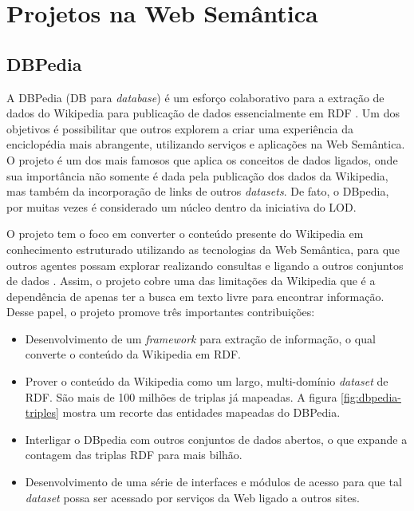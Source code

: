 \section{Projetos na Web Semântica}

\subsection{DBPedia}

A DBPedia (DB para \textit{database}) é um esforço colaborativo para a extração de dados do Wikipedia para publicação de dados essencialmente em RDF \citep{Auer:2007:DNW:1785162.1785216}. Um dos objetivos é possibilitar que outros explorem a criar uma experiência da enciclopédia mais abrangente, utilizando serviços e aplicações na Web Semântica. O projeto é um dos mais famosos que aplica os conceitos de dados ligados, onde sua importância não somente é dada pela publicação dos dados da Wikipedia, mas também da incorporação de links de outros \textit{datasets}. De fato, o DBpedia, por muitas vezes é considerado um núcleo dentro da iniciativa do LOD.

O projeto tem o foco em converter o conteúdo presente do Wikipedia em conhecimento estruturado utilizando as tecnologias da Web Semântica, para que outros agentes possam explorar realizando consultas e ligando a outros conjuntos de dados \citep{Auer:2007:DNW:1785162.1785216}. Assim, o projeto cobre uma das limitações da Wikipedia que é a dependência de apenas ter a busca em texto livre para encontrar informação. Desse papel, o projeto promove três importantes contribuições:

\begin{itemize}
	\item{Desenvolvimento de um \textit{framework} para extração de informação, o qual converte o conteúdo da Wikipedia em RDF.} 

	\item{Prover o conteúdo da Wikipedia como um largo, multi-domínio \textit{dataset} de RDF. São mais de 100 milhões de triplas já mapeadas. A figura \ref{fig:dbpedia-triples} mostra um recorte das entidades mapeadas do DBPedia.}
	
	\item{Interligar o DBpedia com outros conjuntos de dados abertos, o que expande a contagem das triplas RDF para mais bilhão.}
	
	\item{Desenvolvimento de uma série de interfaces e módulos de acesso para que tal \textit{dataset} possa ser acessado por serviços da Web ligado a outros sites.}	
\end{itemize}

